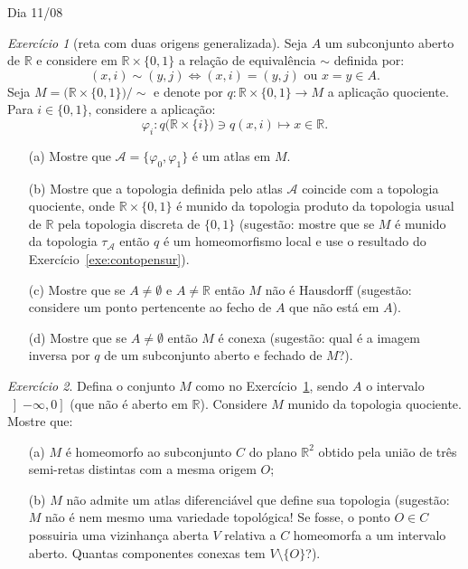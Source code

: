 \documentclass[oneside,11pt]{amsart}
\newcommand{\R}{\mathds R}
\theoremstyle{remark}\newtheorem{exercise}{Exercício}[section]
\theoremstyle{plain}\newtheorem{teo}{Teorema}[section]
\theoremstyle{plain}\newtheorem{lem}[teo]{Lema}
\theoremstyle{plain}\newtheorem{prop}[teo]{Proposição}
\theoremstyle{definition}\newtheorem{defin}[teo]{Definição}
\theoremstyle{remark}\newtheorem{rem}[teo]{Observação}
\theoremstyle{definition}\newtheorem{example}[teo]{Exemplo}
\numberwithin{equation}{section}
\begin{document}
\begin{section}{Dia 11/08}
\begin{exercise}[reta com duas origens generalizada]\label{exe:duasorigens}
Seja $A$ um subconjunto aberto de $\R$ e considere em $\R\times\{0,1\}$ a relação de equivalência $\sim$ definida por:
\[(x,i)\sim(y,j)\Longleftrightarrow\text{$(x,i)=(y,j)$ ou $x=y\in A$}.\]
Seja $M=\big(\R\times\{0,1\}\big)/{\sim}$ e denote por $q:\R\times\{0,1\}\to M$ a aplicação quociente.
Para $i\in\{0,1\}$, considere a aplicação:
\[\varphi_i:q\big(\R\times\{i\}\big)\ni q(x,i)\longmapsto x\in\R.\]
\begin{itemize}
\item[(a)] Mostre que $\mathcal A=\{\varphi_0,\varphi_1\}$ é um atlas em $M$.
\item[(b)] Mostre que a topologia definida pelo atlas $\mathcal A$ coincide com a topologia quociente, onde $\R\times\{0,1\}$ é munido da topologia
produto da topologia usual de $\R$ pela topologia discreta de $\{0,1\}$ (sugestão:
mostre que se $M$ é munido da topologia $\tau_{\mathcal A}$ então $q$ é um homeomorfismo local e use o resultado do Exercício~\ref{exe:contopensur}).
\item[(c)] Mostre que se $A\ne\emptyset$ e $A\ne\R$ então $M$ não é Hausdorff (sugestão: considere um ponto pertencente ao fecho de $A$ que não está em $A$).
\item[(d)] Mostre que se $A\ne\emptyset$ então $M$ é conexa (sugestão: qual é a imagem inversa por $q$ de um subconjunto
aberto e fechado de $M$?).
\end{itemize}
\end{exercise}

\begin{exercise}
Defina o conjunto $M$ como no Exercício~\ref{exe:duasorigens}, sendo $A$ o intervalo $\left]-\infty,0\right]$ (que não é aberto em $\R$). Considere $M$ munido
da topologia quociente. Mostre que:
\begin{itemize}
\item[(a)] $M$ é homeomorfo ao subconjunto $C$ do plano $\R^2$ obtido pela união de três semi-retas distintas com a mesma origem $O$;
\item[(b)] $M$ não admite um atlas diferenciável que define sua topologia (sugestão: $M$ não é nem mesmo uma variedade topológica! Se fosse, o ponto
$O\in C$ possuiria uma vizinhança aberta $V$ relativa a $C$ homeomorfa a um intervalo aberto. Quantas componentes conexas tem $V\setminus\{O\}$?).
\end{itemize}
\end{exercise}


\end{section}
\end{document}

